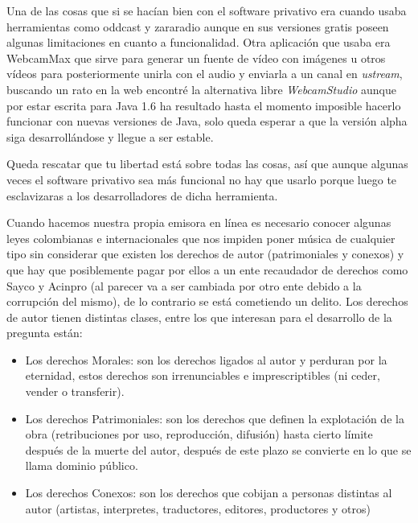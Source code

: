 \begin{multicols}{2}
Una de las cosas que si se hacían bien con el software privativo era cuando usaba herramientas como oddcast y zararadio aunque en sus versiones gratis poseen algunas limitaciones en cuanto a funcionalidad. Otra aplicación que usaba era WebcamMax que sirve para generar un fuente de vídeo con imágenes u otros vídeos para posteriormente unirla con el audio y enviarla a un canal en {\em ustream}, buscando un rato en la web encontré la alternativa libre {\em WebcamStudio} aunque por estar escrita para Java 1.6 ha resultado hasta el momento imposible hacerlo funcionar con nuevas versiones de Java, solo queda esperar a que la versión alpha siga desarrollándose y llegue a ser estable.

Queda rescatar que tu libertad está sobre todas las cosas, así que aunque algunas veces el software privativo sea más funcional no hay que usarlo porque luego te esclavizaras a los desarrolladores de dicha herramienta.




Cuando hacemos nuestra propia emisora en línea es necesario conocer algunas leyes colombianas e internacionales que nos impiden poner música de cualquier tipo sin considerar que existen los derechos de autor (patrimoniales y conexos) y que hay que posiblemente pagar por ellos a un ente recaudador de derechos como Sayco y Acinpro (al parecer va a ser cambiada por otro ente debido a la corrupción del mismo), de lo contrario se está cometiendo un delito.
Los derechos de autor tienen distintas clases, entre los que interesan para el desarrollo de la pregunta están:
\begin{itemize}
\item Los derechos Morales: son los derechos ligados al autor y perduran por la eternidad, estos derechos son irrenunciables e imprescriptibles (ni ceder, vender o transferir).
\item Los derechos Patrimoniales: son los derechos que definen la explotación de la obra (retribuciones por uso, reproducción, difusión) hasta cierto límite después de la muerte del autor, después de este plazo se convierte en lo que se llama dominio público.
\item Los derechos Conexos: son los derechos que cobijan a personas distintas al autor (artistas, interpretes, traductores, editores, productores y otros)
\end{itemize}


\end{multicols}
